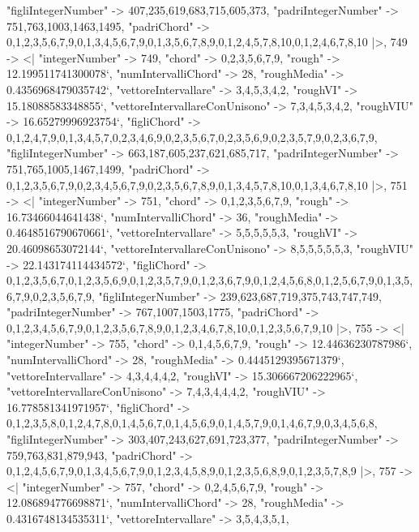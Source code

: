 \documentclass[
]{article}
\begin{document}
\begin{DatasetVerbatim}
    "figliIntegerNumber" -> {407,235,619,683,715,605,373},
    "padriIntegerNumber" -> {751,763,1003,1463,1495},
    "padriChord" -> {{0,1,2,3,5,6,7,9},{0,1,3,4,5,6,7,9},{0,1,3,5,6,7,8,9},{0,1,2,4,5,7,8,10},{0,1,2,4,6,7,8,10}}
  |>,
  749 -> <|
    "integerNumber" -> 749,
    "chord" -> {0,2,3,5,6,7,9},
    "rough" -> 12.199511741300078`,
    "numIntervalliChord" -> 28,
    "roughMedia" -> 0.4356968479035742`,
    "vettoreIntervallare" -> {3,4,5,3,4,2},
    "roughVI" -> 15.18088583348855`,
    "vettoreIntervallareConUnisono" -> {7,3,4,5,3,4,2},
    "roughVIU" -> 16.65279996923754`,
    "figliChord" -> {{0,1,2,4,7,9},{0,1,3,4,5,7},{0,2,3,4,6,9},{0,2,3,5,6,7},{0,2,3,5,6,9},{0,2,3,5,7,9},{0,2,3,6,7,9}},
    "figliIntegerNumber" -> {663,187,605,237,621,685,717},
    "padriIntegerNumber" -> {751,765,1005,1467,1499},
    "padriChord" -> {{0,1,2,3,5,6,7,9},{0,2,3,4,5,6,7,9},{0,2,3,5,6,7,8,9},{0,1,3,4,5,7,8,10},{0,1,3,4,6,7,8,10}}
  |>,
  751 -> <|
    "integerNumber" -> 751,
    "chord" -> {0,1,2,3,5,6,7,9},
    "rough" -> 16.73466044641438`,
    "numIntervalliChord" -> 36,
    "roughMedia" -> 0.4648516790670661`,
    "vettoreIntervallare" -> {5,5,5,5,5,3},
    "roughVI" -> 20.46098653072144`,
    "vettoreIntervallareConUnisono" -> {8,5,5,5,5,5,3},
    "roughVIU" -> 22.143174114434572`,
    "figliChord" -> {{0,1,2,3,5,6,7},{0,1,2,3,5,6,9},{0,1,2,3,5,7,9},{0,1,2,3,6,7,9},{0,1,2,4,5,6,8},{0,1,2,5,6,7,9},{0,1,3,5,6,7,9},{0,2,3,5,6,7,9}},
    "figliIntegerNumber" -> {239,623,687,719,375,743,747,749},
    "padriIntegerNumber" -> {767,1007,1503,1775},
    "padriChord" -> {{0,1,2,3,4,5,6,7,9},{0,1,2,3,5,6,7,8,9},{0,1,2,3,4,6,7,8,10},{0,1,2,3,5,6,7,9,10}}
  |>,
  755 -> <|
    "integerNumber" -> 755,
    "chord" -> {0,1,4,5,6,7,9},
    "rough" -> 12.44636230787986`,
    "numIntervalliChord" -> 28,
    "roughMedia" -> 0.4445129395671379`,
    "vettoreIntervallare" -> {4,3,4,4,4,2},
    "roughVI" -> 15.306667206222965`,
    "vettoreIntervallareConUnisono" -> {7,4,3,4,4,4,2},
    "roughVIU" -> 16.778581341971957`,
    "figliChord" -> {{0,1,2,3,5,8},{0,1,2,4,7,8},{0,1,4,5,6,7},{0,1,4,5,6,9},{0,1,4,5,7,9},{0,1,4,6,7,9},{0,3,4,5,6,8}},
    "figliIntegerNumber" -> {303,407,243,627,691,723,377},
    "padriIntegerNumber" -> {759,763,831,879,943},
    "padriChord" -> {{0,1,2,4,5,6,7,9},{0,1,3,4,5,6,7,9},{0,1,2,3,4,5,8,9},{0,1,2,3,5,6,8,9},{0,1,2,3,5,7,8,9}}
  |>,
  757 -> <|
    "integerNumber" -> 757,
    "chord" -> {0,2,4,5,6,7,9},
    "rough" -> 12.086894776698871`,
    "numIntervalliChord" -> 28,
    "roughMedia" -> 0.4316748134535311`,
    "vettoreIntervallare" -> {3,5,4,3,5,1},

\end{DatasetVerbatim}
\end{document}
